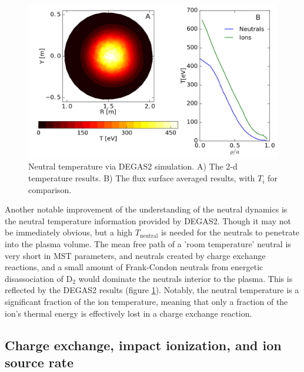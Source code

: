 \begin{figure}
    \centering
    \includegraphics[width=\linewidth]{ion_transport_results/DEGAS2_temperature2d.png}
    \caption[Neutral temperature via DEGAS2]{Neutral temperature via DEGAS2 simulation. A) The 2-d temperature results. B) The flux surface averaged results, with $T_i$ for comparison.}
    \label{fig:DEGAS2_temperature}
\end{figure}

Another notable improvement of the understanding of the neutral dynamics is the neutral temperature information provided by DEGAS2. Though it may not be immediately obvious, but a high $T_{\text{neutral}}$ is needed for the neutrals to penetrate into the plasma volume. The mean free path of a 'room temperature' neutral is very short in MST parameters, and neutrals created by charge exchange reactions, and a small amount of Frank-Condon neutrals from energetic disassociation of D$_2$ would dominate the neutrals interior to the plasma. This is reflected by the DEGAS2 results (figure \ref{fig:DEGAS2_temperature}). Notably, the neutral temperature is a significant fraction of the ion temperature, meaning that only a fraction of the ion's thermal energy is effectively lost in a charge exchange reaction.

\subsection{Charge exchange, impact ionization, and ion source rate}

